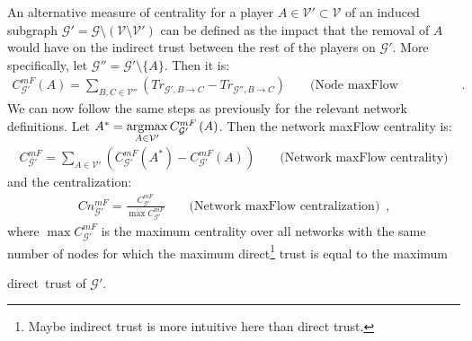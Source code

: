     An alternative measure of centrality for a player $A \in \mathcal{V}' \subset \mathcal{V}$ of an induced subgraph
    $\mathcal{G}' = \mathcal{G} \setminus \left(\mathcal{V} \setminus \mathcal{V}'\right)$ can be defined as the impact that
    the removal of $A$ would have on the indirect trust between the rest of the players on $\mathcal{G}'$. More specifically,
    let $\mathcal{G}'' = \mathcal{G}' \setminus \{A\}$. Then it is:
    \begin{align*}
      C^{mF}_{\mathcal{G}'}\left(A\right) = \sum\limits_{B,C \in \mathcal{V}''}\left(Tr_{\mathcal{G}', B \rightarrow C} -
      Tr_{\mathcal{G}'', B \rightarrow C}\right) && \mbox{ (Node maxFlow centrality)} \enspace.
    \end{align*}
    We can now follow the same steps as previously for the relevant network definitions. Let $A^* = \operatorname*{argmax}\limits_{A \in
    \mathcal{V}'}C^{mF}_{\mathcal{G}'}\left(A\right)$. Then the network maxFlow centrality is:
    \begin{align*}
      C^{mF}_{\mathcal{G}'} = \sum\limits_{A \in \mathcal{V}'}\left(C^{mF}_{\mathcal{G}'}\left(A^*\right) -
      C^{mF}_{\mathcal{G}'}\left(A\right)\right) && \mbox{ (Network maxFlow centrality)}
    \end{align*}
    and the centralization:
    \begin{align*}
      Cn^{mF}_{\mathcal{G}'} = \frac{C^{mF}_{\mathcal{G}'}}{\max C^{mF}_{\mathcal{G}'}} && \mbox{ (Network maxFlow
      centralization)} \enspace,
    \end{align*}
    where $\max C^{mF}_{\mathcal{G}'}$ is the maximum centrality over all networks with the same number of nodes for which the
    maximum direct\footnote{Maybe indirect trust is more intuitive here than direct trust.} trust is equal to the maximum
    \addtocounter{footnote}{-1} direct\footnotemark \ trust of $\mathcal{G}'$.
